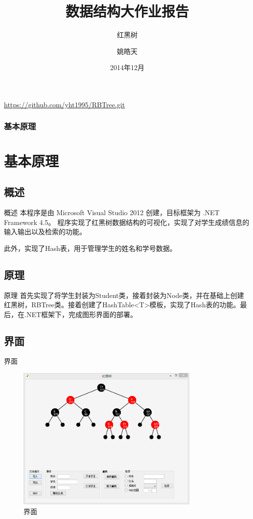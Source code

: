 \documentclass{beamer}
\begin{document}
\title{数据结构大作业报告}
\subtitle{红黑树}
\author{姚皓天}

\date{2014年12月}
\subject{数据结构}

\begin{frame} 
\titlepage 
\begin{center}
\url{https://github.com/yht1995/RBTree.git}
\end{center}
\end{frame} 
\begin{frame}
\frametitle{基本原理}
\section{基本原理}
\subsection{概述}
\begin{block}{概述}
本程序是由 Microsoft Visual Studio 2012 创建，目标框架为 .NET Framework 4.5。
程序实现了红黑树数据结构的可视化，实现了对学生成绩信息的输入输出以及检索的功能。\par
此外，实现了Hash表，用于管理学生的姓名和学号数据。
\end{block}
\subsection{原理}
\begin{block}{原理}
首先实现了将学生封装为Student类，接着封装为Node类，并在基础上创建红黑树，RBTree类。接着创建了HashTable<T>模板，实现了Hash表的功能。最后，在.NET框架下，完成图形界面的部署。
\end{block}
\end{frame}

\begin{frame}
\subsection{界面}
\begin{block}{界面}
\begin{figure}[H]
\centering
\includegraphics[width=0.8\textwidth]{2.png}
\caption{界面} 
\end{figure}
\end{block}
\end{frame}
\end{document}
